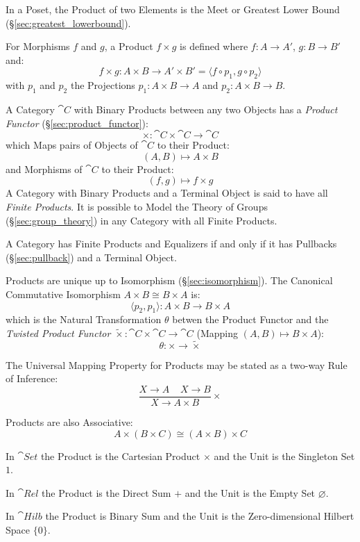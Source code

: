 In a Poset, the Product of two Elements is the Meet or Greatest Lower
Bound (\S\ref{sec:greatest_lowerbound}).

For Morphisms $f$ and $g$, a Product $f \times g$ is defined where $f
: A \rightarrow A'$, $g : B \rightarrow B'$ and:
\[
  f \times g : A \times B \rightarrow A' \times B' =
  \langle f \circ p_1, g \circ p_2 \rangle
\]
with $p_1$ and $p_2$ the Projections $p_1 : A \times B \rightarrow A$
and $p_2 : A \times B \rightarrow B$.

A Category $\cat{C}$ with Binary Products between any two Objects
has a \emph{Product Functor} (\S\ref{sec:product_functor}):
\[
  \times : \cat{C} \times \cat{C} \rightarrow \cat{C}
\]
which Maps pairs of Objects of $\cat{C}$ to their Product:
\[
  (A,B) \mapsto A \times B
\]
and Morphisms of $\cat{C}$ to their Product:
\[
  (f,g) \mapsto f \times g
\]
A Category with Binary Products and a Terminal Object is said to have
all \emph{Finite Products}. It is possible to Model the Theory of
Groups (\S\ref{sec:group_theory}) in any Category with all Finite
Products.

A Category has Finite Products and Equalizers if and only if it has
Pullbacks (\S\ref{sec:pullback}) and a Terminal Object. \cite{awodey06}

Products are unique up to Isomorphism (\S\ref{sec:isomorphism}). The
Canonical Commutative Isomorphism $A \times B \cong B \times A$ is:
\[
  \langle p_2, p_1 \rangle : A \times B \rightarrow B \times A
\]
which is the Natural Transformation $\theta$ betwen the Product
Functor and the \emph{Twisted Product Functor} $\tilde{\times} :
\cat{C} \times \cat{C} \rightarrow \cat{C}$ (Mapping $(A,B)
\mapsto B \times A$):
\[
  \theta : \times \rightarrow \tilde{\times}
\]

The Universal Mapping Property for Products may be stated as a two-way
Rule of Inference:
\[
  {
    \frac{X \rightarrow A \;\;\;\; X \rightarrow B}
    {X \rightarrow A \times B}
  }\times
\]

Products are also Associative:
\[
  A \times (B \times C) \cong (A \times B) \times C
\]

In $\cat{Set}$ the Product is the Cartesian Product $\times$ and the
Unit is the Singleton Set $1$.

In $\cat{Rel}$ the Product is the Direct Sum $+$ and the Unit is
the Empty Set $\varnothing$.

In $\cat{Hilb}$ the Product is Binary Sum and the Unit is the
Zero-dimensional Hilbert Space $\{ 0 \}$. %




